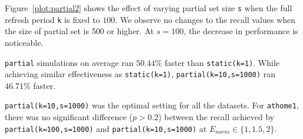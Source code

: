Figure~\ref{plot:partial2} shows the effect of varying partial set size
\texttt{s} when the full refresh period \texttt{k} is fixed to $100$. We observe
no changes to the recall values when the size of partial set is 500 or higher. At
$s=100$, the decrease in performance is noticeable.

\texttt{partial} simulations on average ran $50.44\%$ faster than
\texttt{static(k=1)}. While achieving similar effectiveness as 
\texttt{static(k=1)}, \texttt{partial(k=10,s=1000)} ran $46.71\%$ faster.

\texttt{partial(k=10,s=1000)} was the optimal setting for all the datasets.
For \texttt{athome1}, there was no significant difference ($p > 0.2$) between the recall
achieved by
\texttt{partial(k=100,s=1000)} and \texttt{partial(k=10,s=1000)} at $E_{norm}
\in \{1,1.5,2\}$.

